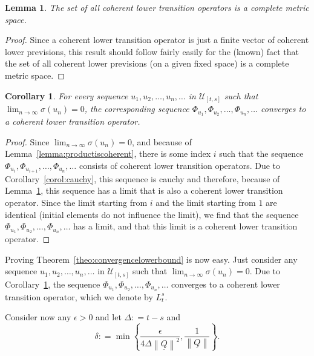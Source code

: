 \documentclass[a4paper,reqno]{amsart}
\newtheorem{corollary}[theorem]{Corollary}
\newtheorem{lemma}[theorem]{Lemma}
\newcommand{\lbound}{L}
\newcommand{\lrate}{\underline{Q}}
\newcommand{\norm}[1]{\left\lVert #1 \right\rVert}
\newcommand{\coloneqq}{:\!=}
\begin{document}
\begin{lemma}\label{lemma:completemetricspace}
The set of all coherent lower transition operators is a complete metric space.
\end{lemma}
\begin{proof}
Since a coherent lower transition operator is just a finite vector of coherent lower previsions, this result should follow fairly easily for the (known) fact that the set of all coherent lower previsions (on a given fixed space) is a complete metric space.
\end{proof}

\begin{corollary}\label{corol:limitexistsandiscoherent}
For every sequence $u_1,u_2,\dots,u_n,\dots$ in $\mathcal{U}_{[t,s]}$ such that $\lim_{n\to\infty}\sigma(u_n)=0$, the corresponding sequence $\Phi_{u_1},\Phi_{u_2},\dots,\Phi_{u_n},\dots$ converges to a coherent lower transition operator.
\end{corollary}
\begin{proof}
Since $\lim_{n\to\infty}\sigma(u_n)=0$, and because of Lemma~\ref{lemma:productiscoherent}, there is some index $i$ such that the sequence $\Phi_{u_i},\Phi_{u_{i+1}},\dots,\Phi_{u_n},\dots$ consists of coherent lower transition operators. Due to Corollary~\ref{corol:cauchy}, this sequence is cauchy and therefore, because of Lemma~\ref{lemma:completemetricspace}, this sequence has a limit that is also a coherent lower transition operator. Since the limit starting from $i$ and the limit starting from $1$ are identical (initial elements do not influence the limit), we find that the sequence $\Phi_{u_1},\Phi_{u_2},\dots,\Phi_{u_n},\dots$ has a limit, and that this limit is a coherent lower transition operator.
\end{proof}

Proving Theorem~\ref{theo:convergencelowerbound} is now easy. Just consider any sequence $u_1,u_2,\dots,u_n,\dots$ in $\mathcal{U}_{[t,s]}$ such that $\lim_{n\to\infty}\sigma(u_n)=0$. Due to Corollary~\ref{corol:limitexistsandiscoherent}, the sequence $\Phi_{u_1},\Phi_{u_2},\dots,\Phi_{u_n},\dots$ converges to a coherent lower transition operator, which we denote by $\lbound_t^s$. 

Consider now any $\epsilon>0$ and let $\Delta\coloneqq t-s$ and
\begin{equation*}
\delta\coloneqq\min\left\{\frac{\epsilon}{4\Delta\norm{\lrate}^2},\frac{1}{\norm{\lrate}}\right\}.
\end{equation*}
\end{document}
